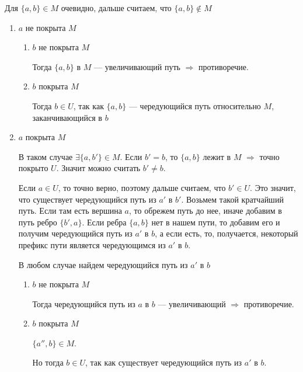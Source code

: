 Для \( \{ a, b \} \in M \) очевидно, дальше считаем, что \( \{ a, b \} \notin M \)
\begin{enumerate}
    \item
        \( a \) не покрыта \( M \)
        \begin{enumerate}
            \item
                \( b \) не покрыта \( M \)

                Тогда \( \{ a, b \} \) в \( M \) --- увеличивающий путь \( \Rightarrow \) противоречие.
            \item
                \( b \) покрыта \( M \)

                Тогда \( b \in U \), так как \( \{ a, b \} \) --- чередующийся путь
                относительно \( M \), заканчивающийся в \( b \)
        \end{enumerate}
    \item
        \( a \) покрыта \( M \)

        В таком случае \( \exists \{ a, b' \} \in M \).
        Если \( b' = b \), то \( \{ a, b \} \) лежит в \( M \)
        \( \Rightarrow \) точно покрыто \( U \). Значит можно считать \( b' \neq b \).

        Если \( a \in U \), то точно верно, поэтому дальше считаем, что \( b' \in U \).
        Это значит, что существует чередующийся путь из \( a' \) в \( b' \).
        Возьмем такой кратчайший путь.
        Если там есть вершина \( a \), то обрежем путь до нее,
        иначе добавим в путь ребро \( \{ b', a \} \).
        Если ребра \( \{ a, b \} \) нет в нашем пути,
        то добавим его и получим чередующийся путь из \( a' \) в \( b \),
        а если есть, то, получается,
        некоторый префикс пути является чередующимся из \( a' \) в \( b \).

        В любом случае найдем чередующийся путь из \( a' \) в \( b \)

        \begin{enumerate}
            \item
                \( b \) не покрыта \( M \)

                Тогда чередующийся путь из \( a \) в \( b \) --- увеличивающий \( \Rightarrow \) противоречие.
            \item
                \( b \) покрыта \( M \)

                \( \{ a'', b \} \in M \).

                Но тогда \( b \in U \), так как существует чередующийся путь из \( a' \) в \( b \).
        \end{enumerate}
\end{enumerate}

